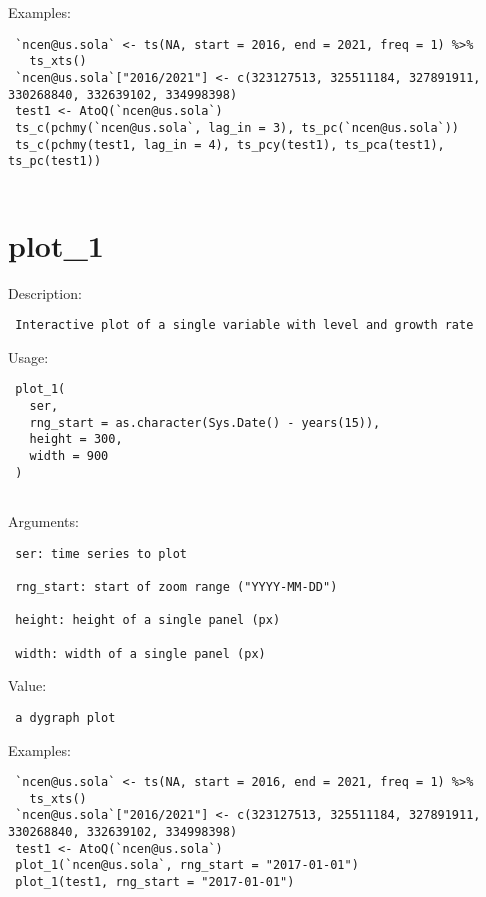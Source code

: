 \documentclass[
  letterpaper,
  DIV=11,
  numbers=noendperiod]{scrreport}
\begin{document}
Examples:

\begin{verbatim}
 `ncen@us.sola` <- ts(NA, start = 2016, end = 2021, freq = 1) %>% 
   ts_xts()
 `ncen@us.sola`["2016/2021"] <- c(323127513, 325511184, 327891911, 330268840, 332639102, 334998398)
 test1 <- AtoQ(`ncen@us.sola`)
 ts_c(pchmy(`ncen@us.sola`, lag_in = 3), ts_pc(`ncen@us.sola`))
 ts_c(pchmy(test1, lag_in = 4), ts_pcy(test1), ts_pca(test1), ts_pc(test1))
 
\end{verbatim}

\section{plot\_1}\label{plot_1}

Description:

\begin{verbatim}
 Interactive plot of a single variable with level and growth rate
\end{verbatim}

Usage:

\begin{verbatim}
 plot_1(
   ser,
   rng_start = as.character(Sys.Date() - years(15)),
   height = 300,
   width = 900
 )
 
\end{verbatim}

Arguments:

\begin{verbatim}
 ser: time series to plot

 rng_start: start of zoom range ("YYYY-MM-DD")

 height: height of a single panel (px)

 width: width of a single panel (px)
\end{verbatim}

Value:

\begin{verbatim}
 a dygraph plot
\end{verbatim}

Examples:

\begin{verbatim}
 `ncen@us.sola` <- ts(NA, start = 2016, end = 2021, freq = 1) %>% 
   ts_xts()
 `ncen@us.sola`["2016/2021"] <- c(323127513, 325511184, 327891911, 330268840, 332639102, 334998398)
 test1 <- AtoQ(`ncen@us.sola`)
 plot_1(`ncen@us.sola`, rng_start = "2017-01-01")
 plot_1(test1, rng_start = "2017-01-01")
 
\end{verbatim}
\end{document}
